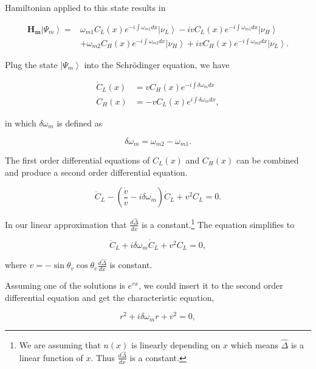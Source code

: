 \documentclass{tufte-handout}
\newcommand{\ket}[1]{\left| #1\right\rangle}
\begin{document}
Hamiltonian applied to this state results in

\begin{align*}
\mathbf{H_m} \ket{\Psi_m} =& \omega_{m1} C_L(x) e^{-i\int \omega_{m1}dx} \ket{\nu_L} -ivC_L(x) e^{-i\int \omega_{m1}dx}\ket{\nu_H} \\ &+\omega_{m2}C_H(x) e^{-i\int \omega_{m2}dx}\ket{\nu_H} + iv C_H(x) e^{-i\int \omega_{m2}dx}\ket{\nu_L}.
\end{align*}

Plug the state $\ket{\Psi_m}$ into the Schrödinger equation, we have

\begin{align*}
\dot C_L(x) &= v C_H(x) e^{ - i\int \delta \omega_m dx} \\
\dot C_H(x) & = -v C_L(x) e^{i\int \delta\omega_m dx} ,
\end{align*}

in which $\delta\omega_m$ is defined as

\begin{equation*}
\delta \omega_m = \omega_{m2} - \omega_{m1}.
\end{equation*}


The first order differential equations of $C_L(x)$ and $C_H(x)$ can be combined and produce a second order differential equation.

\begin{equation*}
\ddot C_L - \left(  \frac{\dot v}{v} - i\delta \omega_m \right) \dot C_L + v^2 C_L = 0.
\end{equation*}

In our linear approximation that $\frac{d\hat\Delta}{dx}$ is a constant.\footnote{We are assuming that $n(x)$ is linearly depending on $x$ which means $\hat\Delta$ is a linear function of $x$. Thus $\frac{d\hat\Delta}{dx}$ is a constant.} The equation simplifies to

\begin{equation*}
\ddot C_L + i\delta\omega_m \dot C_L + v^2 C_L = 0,
\end{equation*}

where $v=-\sin\theta_v\cos\theta_v \frac{d\hat\Delta}{dx}$ is constant.

Assuming one of the solutions is $e^{rx}$, we could insert it to the second order differential equation and get the characteristic equation,

\begin{equation*}
r^2 + i\delta \omega_m r + v^2 = 0,
\end{equation*}
\end{document}
